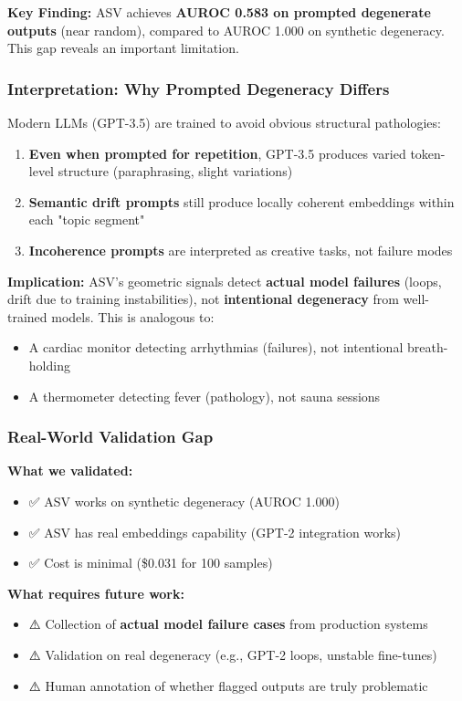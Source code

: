 \documentclass[11pt]{article}
\begin{document}
\textbf{Key Finding:} ASV achieves \textbf{AUROC 0.583 on prompted degenerate outputs} (near random), compared to AUROC 1.000 on synthetic degeneracy. This gap reveals an important limitation.

\subsubsection{Interpretation: Why Prompted Degeneracy Differs}

Modern LLMs (GPT-3.5) are trained to avoid obvious structural pathologies:
\begin{enumerate}
\item \textbf{Even when prompted for repetition}, GPT-3.5 produces varied token-level structure (paraphrasing, slight variations)
\item \textbf{Semantic drift prompts} still produce locally coherent embeddings within each "topic segment"
\item \textbf{Incoherence prompts} are interpreted as creative tasks, not failure modes
\end{enumerate}

\textbf{Implication:} ASV's geometric signals detect \textbf{actual model failures} (loops, drift due to training instabilities), not \textbf{intentional degeneracy} from well-trained models. This is analogous to:
\begin{itemize}
\item A cardiac monitor detecting arrhythmias (failures), not intentional breath-holding
\item A thermometer detecting fever (pathology), not sauna sessions
\end{itemize}

\subsubsection{Real-World Validation Gap}

\textbf{What we validated:}
\begin{itemize}
\item ✅ ASV works on synthetic degeneracy (AUROC 1.000)
\item ✅ ASV has real embeddings capability (GPT-2 integration works)
\item ✅ Cost is minimal (\$0.031 for 100 samples)
\end{itemize}

\textbf{What requires future work:}
\begin{itemize}
\item ⚠️ Collection of \textbf{actual model failure cases} from production systems
\item ⚠️ Validation on real degeneracy (e.g., GPT-2 loops, unstable fine-tunes)
\item ⚠️ Human annotation of whether flagged outputs are truly problematic
\end{itemize}
\end{document}
